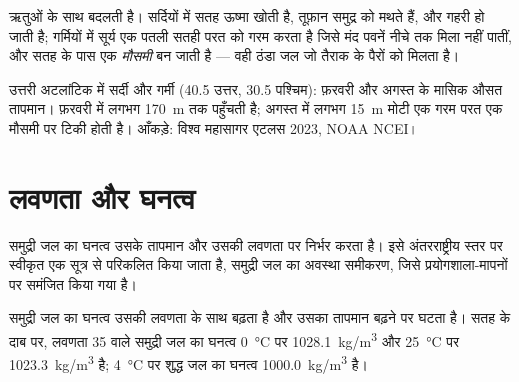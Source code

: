  ऋतुओं के साथ बदलती है। सर्दियों में सतह ऊष्मा खोती है,
तूफ़ान समुद्र को मथते हैं, और  गहरी हो जाती है; गर्मियों में सूर्य
एक पतली सतही परत को गरम करता है जिसे मंद पवनें नीचे तक मिला नहीं पातीं, और
सतह के पास एक \emph{मौसमी } बन जाती है --- वही ठंडा जल जो
तैराक के पैरों को मिलता है।

\begin{omfigure}

{\small उत्तरी अटलांटिक में सर्दी और गर्मी (40.5\textdegree{} उत्तर,
30.5\textdegree{} पश्चिम): फ़रवरी और अगस्त के मासिक औसत तापमान।
फ़रवरी में  लगभग \qty{170}{m} तक पहुँचती है; अगस्त में लगभग \qty{15}{m} मोटी
एक गरम परत एक मौसमी  पर टिकी होती है। आँकड़े: विश्व
महासागर एटलस 2023, NOAA NCEI।}
\end{omfigure}

\section{लवणता और घनत्व}

समुद्री जल का घनत्व उसके तापमान और उसकी लवणता पर निर्भर करता है। इसे
अंतरराष्ट्रीय स्तर पर स्वीकृत एक सूत्र से परिकलित किया जाता है, समुद्री जल का अवस्था
समीकरण, जिसे प्रयोगशाला-मापनों पर समंजित किया गया है।

\begin{proposition}[समुद्री जल का घनत्व]\label{prop:g10:layered-ocean:density}
समुद्री जल का घनत्व उसकी लवणता के साथ बढ़ता है और उसका
तापमान बढ़ने पर घटता है। सतह के दाब पर, लवणता 35 वाले समुद्री जल का
घनत्व \qty{0}{\degreeCelsius} पर \qty{1028.1}{kg/m^3} और
\qty{25}{\degreeCelsius} पर \qty{1023.3}{kg/m^3} है;
\qty{4}{\degreeCelsius} पर शुद्ध जल का घनत्व \qty{1000.0}{kg/m^3} है।
\end{proposition}

